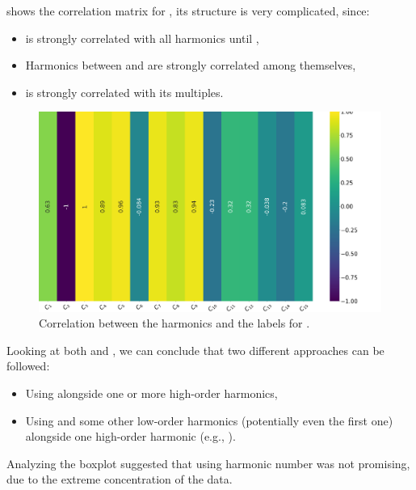 shows the correlation matrix for \cnmod, its structure is very complicated,
since:
\begin{itemize}
	\item \cnmod[2] is strongly correlated with all harmonics until \cnmod[9],
	\item Harmonics between \cnmod[10] and \cnmod[15] are strongly correlated among themselves,
	\item \cnmod[4] is strongly correlated with its multiples.
\end{itemize}
\begin{figure}[!ht]
	\centering
	\includegraphics[width=\linewidth]{img/Cnmod_label_corr.png}
	\caption{Correlation between the harmonics and the labels for \cnmod.} \label{fig:cnmod-lcorr}
\end{figure}

Looking at both  and , we can conclude that two different
approaches can be followed:
\begin{itemize}
	\item Using \cnmod[2] alongside one or more high-order harmonics,
	\item Using \cnmod[3] and some other low-order harmonics (potentially even the
	      first one) alongside one high-order harmonic (e.g., \cnmod[14]).
\end{itemize}
Analyzing the boxplot suggested that using harmonic number \cnmod[2] was not promising, due to the extreme
concentration of the data.

